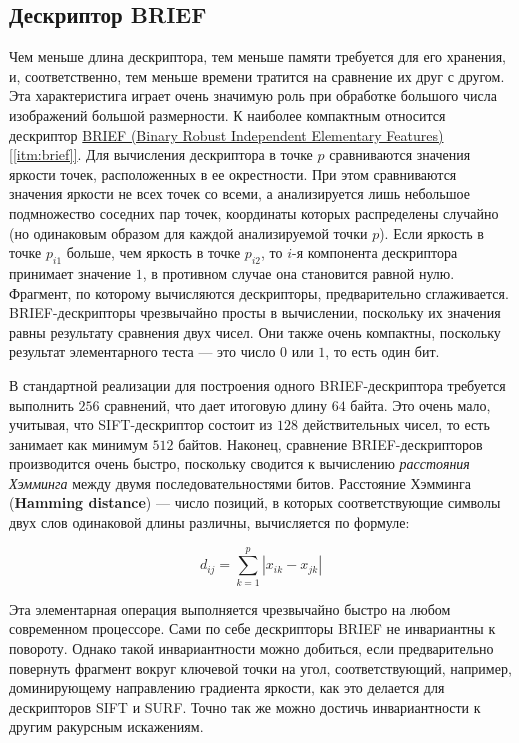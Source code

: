 \subsection{Дескриптор BRIEF}

Чем меньше длина дескриптора, тем меньше памяти требуется для его хранения, и, соответственно, тем меньше времени тратится на сравнение их друг с другом. Эта характеристига играет очень значимую роль при обработке большого числа изображений большой размерности. К наиболее компактным относится дескриптор \hyperref[itm:brief]{ BRIEF (Binary Robust Independent Elementary Features) [\ref{itm:brief}]}. Для вычисления дескриптора в точке $p$ сравниваются значения яркости точек, расположенных в ее окрестности. При этом сравниваются значения яркости не всех точек со всеми, а анализируется лишь небольшое подмножество соседних пар точек, координаты которых распределены случайно (но одинаковым образом для каждой анализируемой точки $p$). Если яркость в точке $p_{i1}$ больше, чем яркость в точке $p_{i2}$, то $i$-я компонента дескриптора принимает значение $1$, в противном случае она становится равной нулю. Фрагмент, по которому вычисляются дескрипторы, предварительно сглаживается. BRIEF-дескрипторы чрезвычайно просты в вычислении, поскольку их значения равны результату сравнения двух чисел. Они также очень компактны, поскольку результат элементарного теста — это число $0$ или $1$, то есть один бит.

В стандартной реализации для построения одного BRIEF-дескриптора требуется выполнить $256$ сравнений, что дает итоговую длину $64$ байта. Это очень мало, учитывая, что SIFT-дескриптор состоит из $128$ действительных чисел, то есть занимает как минимум $512$ байтов. Наконец, сравнение BRIEF-дескрипторов производится очень быстро, поскольку сводится к вычислению \textit{расстояния Хэмминга} между двумя последовательностями битов. Расстояние Хэмминга (\textbf{Hamming distance}) — число позиций, в которых соответствующие символы двух слов одинаковой длины различны, вычисляется по формуле:

\begin{equation}
    d_{ij} = \sum_{k=1}^{p}|x_{ik} - x_{jk}|
\end{equation}

Эта элементарная операция выполняется чрезвычайно быстро на любом современном процессоре. Сами по себе дескрипторы BRIEF не инвариантны к повороту. Однако такой инвариантности можно добиться, если предварительно повернуть фрагмент вокруг ключевой точки на угол, соответствующий, например, доминирующему направлению градиента яркости, как это делается для дескрипторов SIFT и SURF. Точно так же можно достичь инвариантности к другим ракурсным искажениям.

